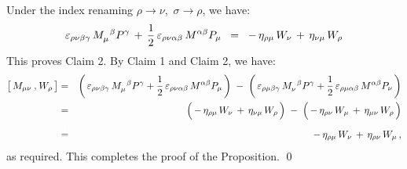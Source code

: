 \begin{enumerate}
\begin{equation*}
    \end{equation*}
    Under the index renaming $\rho\rightarrow\nu$,\, $\sigma\rightarrow\rho$, we have:
    \begin{equation*}
    \varepsilon_{\rho\nu\beta\gamma}\,M^{{\color{white}\mu}\beta}_{\mu}P^{\gamma}
    \,+\,
    \dfrac{1}{2}\,\varepsilon_{\rho\nu\alpha\beta}\,M^{\alpha\beta}P_{\mu}
    \;\; = \;\;
	    -\,\eta_{\rho\mu}\,W_{\nu}
	    \,\overset{{\color{white}.}}{+}\,
	    \eta_{\nu\mu}\,W_{\rho}
    \end{equation*}
    This proves Claim 2.
	\vskip 0.3cm
	\noindent
	By Claim 1 and Claim 2, we have:
	\begin{eqnarray*}
	\left[\,
		M_{\mu\nu}
		\,\overset{{\color{white}1}}{,}\,
		W_{\rho}
		\,\right]
	& = &
		\left(\,
			\varepsilon_{\rho\nu\beta\gamma}\,
			M_{\mu}^{{\color{white}\mu}\beta}P^{\gamma}
			+
			\dfrac{1}{2}\,\varepsilon_{\rho\nu\alpha\beta}\,
			M^{\alpha\beta}P_{\mu}
			\,\right)
		\;-\;
		\left(\,
			\varepsilon_{\rho\mu\beta\gamma}\,
			M_{\nu}^{{\color{white}\nu}\beta}P^{\gamma}
			+
			\dfrac{1}{2}\,\varepsilon_{\rho\mu\alpha\beta}\,
			M^{\alpha\beta}P_{\nu}
			\,\right)
	\\
	& = &
		\left(\,
			-\,\eta_{\rho\mu}\,W_{\nu}
			\,\overset{{\color{white}.}}{+}\,
			\eta_{\nu\mu}\,W_{\rho}
			\,\right)
		\; - \;
		\left(\,
			-\,\eta_{\rho\nu}\,W_{\mu}
			\,\overset{{\color{white}.}}{+}\,
			\eta_{\mu\nu}\,W_{\rho}
			\,\right)
	\\
	& \overset{{\color{white}\textnormal{\large$1$}}}{=} &
		-\,\eta_{\rho\mu}\,W_{\nu} \,+\, \eta_{\rho\nu}\,W_{\mu}\,,
	\end{eqnarray*}
	as required.
	This completes the proof of the Proposition.
	\qed
\end{enumerate}

